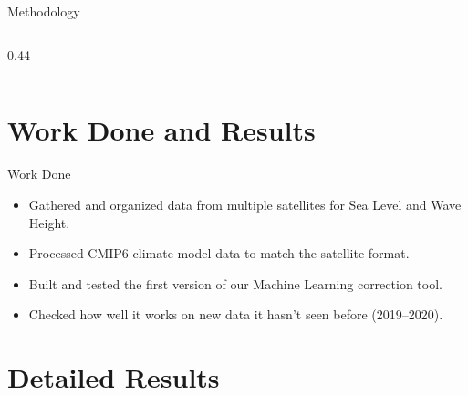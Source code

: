 \documentclass[aspectratio=169]{beamer}
\newcommand{\footerdetails}{}
\newcommand{\setfooter}[1]{\renewcommand{\footerdetails}{#1}}
\begin{document}
\begin{frame}{Methodology}
\begin{columns}[T,onlytextwidth]
\begin{column}{0.44\textwidth}
{%
      }
    \end{column}
  \end{columns}
\end{frame}

\section{Work Done and Results}
\begin{frame}{Work Done}
  \setfooter{Summary of progress: Data collection and initial tool development}
  \begin{itemize}
    \item Gathered and organized data from multiple satellites for Sea Level and Wave Height.
    \item Processed CMIP6 climate model data to match the satellite format.
    \item Built and tested the first version of our Machine Learning correction tool.
    \item Checked how well it works on new data it hasn't seen before (2019--2020).
  \end{itemize}
\end{frame}

\section{Detailed Results}
\end{document}
